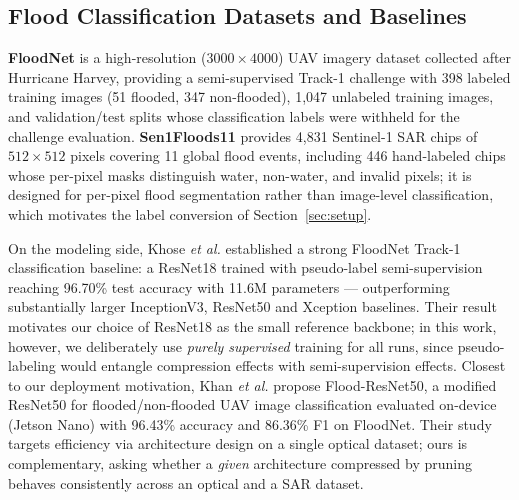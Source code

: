 \documentclass[conference]{IEEEtran}
\begin{document}
\subsection{Flood Classification Datasets and Baselines}
\textbf{FloodNet} \cite{rahnemoonfar2021floodnet} is a high-resolution
($3000\times4000$) UAV imagery dataset collected after Hurricane
Harvey, providing a semi-supervised Track-1 challenge with 398 labeled
training images (51 flooded, 347 non-flooded), 1{,}047 unlabeled
training images, and validation/test splits whose classification
labels were withheld for the challenge evaluation.
\textbf{Sen1Floods11} \cite{bonafilia2020sen1floods11} provides 4{,}831
Sentinel-1 SAR chips of $512\times512$ pixels covering 11 global flood
events, including 446 hand-labeled chips whose per-pixel masks
distinguish water, non-water, and invalid pixels; it is designed for
per-pixel flood segmentation rather than image-level classification,
which motivates the label conversion of Section~\ref{sec:setup}.

On the modeling side, Khose \emph{et al.}
\cite{khose2021semisupervised} established a strong FloodNet Track-1
classification baseline: a ResNet18 trained with pseudo-label
semi-supervision \cite{lee2013pseudo} reaching 96.70\% test accuracy
with 11.6M parameters --- outperforming substantially larger
InceptionV3, ResNet50 and Xception baselines. Their result motivates
our choice of ResNet18 as the small reference backbone; in this work,
however, we deliberately use \emph{purely supervised} training for all
runs, since pseudo-labeling would entangle compression effects with
semi-supervision effects. Closest to our deployment motivation, Khan
\emph{et al.} \cite{khan2023floodresnet50} propose Flood-ResNet50, a
modified ResNet50 for flooded/non-flooded UAV image classification
evaluated on-device (Jetson Nano) with 96.43\% accuracy and 86.36\% F1
on FloodNet. Their study targets efficiency via architecture design on
a single optical dataset; ours is complementary, asking whether a
\emph{given} architecture compressed by pruning behaves consistently
across an optical and a SAR dataset.
\end{document}
